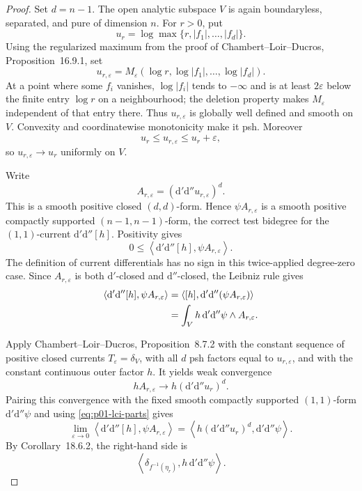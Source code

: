 \begin{proof}
Set $d=n-1$.  The open analytic subspace $V$ is again boundaryless,
separated, and pure of dimension $n$.  For $r>0$, put
\[
 u_r=\log\max\{r,|f_1|,\ldots,|f_d|\}.
\]
Using the regularized maximum from the proof of Chambert--Loir--Ducros,
Proposition~16.9.1, set
\[
 u_{r,\varepsilon}
 =M_\varepsilon(\log r,\log|f_1|,\ldots,\log|f_d|).
\]
At a point where some $f_i$ vanishes, $\log|f_i|$ tends to $-\infty$ and is
at least $2\varepsilon$ below the finite entry $\log r$ on a neighbourhood;
the deletion property makes $M_\varepsilon$ independent of that entry
there.  Thus $u_{r,\varepsilon}$ is globally well defined and smooth on
$V$.  Convexity and coordinatewise monotonicity make it psh.  Moreover
\[
 u_r\leq u_{r,\varepsilon}\leq u_r+\varepsilon,
\]
so $u_{r,\varepsilon}\to u_r$ uniformly on $V$.

Write
\[
 A_{r,\varepsilon}
   =(\mathrm d'\mathrm d''u_{r,\varepsilon})^d.
\]
This is a smooth positive closed $(d,d)$-form.  Hence
$\psi A_{r,\varepsilon}$ is a smooth positive compactly supported
$(n-1,n-1)$-form, the correct test bidegree for the $(1,1)$-current
$\mathrm d'\mathrm d''[h]$.  Positivity gives
\begin{equation}
\label{eq:p01-lci-positive}
 0\leq
 \left\langle\mathrm d'\mathrm d''[h],
              \psi A_{r,\varepsilon}\right\rangle.
\end{equation}
The definition of current differentials has no sign in this twice-applied
degree-zero case.  Since $A_{r,\varepsilon}$ is both
$\mathrm d'$-closed and $\mathrm d''$-closed, the Leibniz rule gives
\begin{align}
 \left\langle\mathrm d'\mathrm d''[h],
              \psi A_{r,\varepsilon}\right\rangle
 &=\left\langle[h],
       \mathrm d'\mathrm d''(\psi A_{r,\varepsilon})\right\rangle\notag\\
 &=\int_V h\,\mathrm d'\mathrm d''\psi\wedge A_{r,\varepsilon}.
\label{eq:p01-lci-parts}
\end{align}

Apply Chambert--Loir--Ducros, Proposition~8.7.2 with the constant sequence
of positive closed currents $T_\varepsilon=\delta_V$, with all $d$ psh
factors equal to $u_{r,\varepsilon}$, and with the constant continuous outer
factor $h$.  It yields weak convergence
\[
 hA_{r,\varepsilon}
 \longrightarrow
 h(\mathrm d'\mathrm d''u_r)^d.
\]
Pairing this convergence with the fixed smooth compactly supported
$(1,1)$-form $\mathrm d'\mathrm d''\psi$ and using
\eqref{eq:p01-lci-parts} gives
\begin{equation}
\label{eq:p01-lci-bt-limit}
 \lim_{\varepsilon\to0}
 \left\langle\mathrm d'\mathrm d''[h],
              \psi A_{r,\varepsilon}\right\rangle
 =\left\langle
   h(\mathrm d'\mathrm d''u_r)^d,
   \mathrm d'\mathrm d''\psi\right\rangle.
\end{equation}
By Corollary~18.6.2, the right-hand side is
\[
 \left\langle\delta_{f^{-1}(\eta_r)},
                   h\,\mathrm d'\mathrm d''\psi\right\rangle.
\]


\end{proof}
